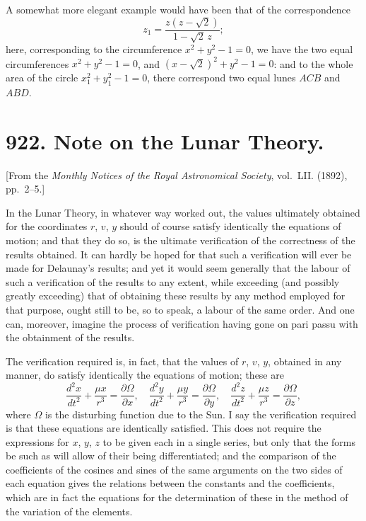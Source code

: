 \documentclass[11pt,a4paper]{book}
\begin{document}
{{{A somewhat more elegant example would have been that of the correspondence
\[
z_1 = \frac{z(z-\sqrt{2})}{1-\sqrt{2}\,z};
\]
here, corresponding to the circumference $x^2 + y^2 - 1 = 0$, we have the two equal
circumferences $x^2 + y^2 - 1 = 0$, and $(x - \sqrt{2})^2 + y^2 - 1 = 0$: and to the whole area of the
circle $x_1^2 + y_1^2 - 1 = 0$, there correspond two equal lunes $ACB$ and $ABD$.



\newpage
\section*{922. Note on the Lunar Theory.}

[From the \textit{Monthly Notices of the Royal Astronomical Society}, vol.~LII. (1892), pp.~2--5.]

\bigskip

In the Lunar Theory, in whatever way worked out, the values ultimately obtained
for the coordinates $r$, $v$, $y$ should of course satisfy identically the equations of
motion; and that they do so, is the ultimate verification of the correctness of the
results obtained. It can hardly be hoped for that such a verification will ever be
made for Delaunay's results; and yet it would seem generally that the labour of
such a verification of the results to any extent, while exceeding (and possibly greatly
exceeding) that of obtaining these results by any method employed for that purpose,
ought still to be, so to speak, a labour of the same order. And one can, moreover,
imagine the process of verification having gone on pari passu with the obtainment of
the results.

The verification required is, in fact, that the values of $r$, $v$, $y$, obtained in any
manner, do satisfy identically the equations of motion; these are
\[
\frac{d^2x}{dt^2} + \frac{\mu x}{r^3} = \frac{\partial\Omega}{\partial x}, \quad
\frac{d^2y}{dt^2} + \frac{\mu y}{r^3} = \frac{\partial\Omega}{\partial y}, \quad
\frac{d^2z}{dt^2} + \frac{\mu z}{r^3} = \frac{\partial\Omega}{\partial z},
\]
where $\Omega$ is the disturbing function due to the Sun. I say the verification required is
that these equations are identically satisfied. This does not require the expressions
for $x$, $y$, $z$ to be given each in a single series, but only that the forms be such as
will allow of their being differentiated; and the comparison of the coefficients of the
cosines and sines of the same arguments on the two sides of each equation gives
the relations between the constants and the coefficients, which are in fact the
equations for the determination of these in the method of the variation of the
elements.

}}}
\end{document}
